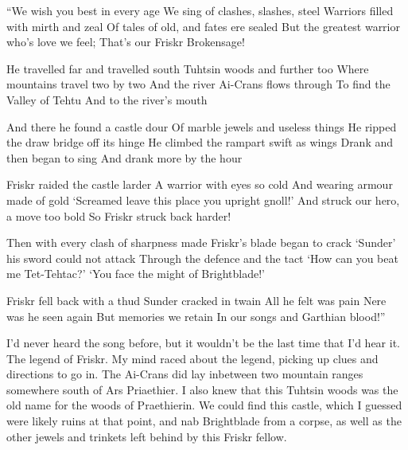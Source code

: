 \documentclass[12pt, a4paper]{book}
\begin{document}
\begin{poem}
\begin{stanza}
``We wish you best in every age\verseline
We sing of clashes, slashes, steel\verseline
Warriors filled with mirth and zeal\verseline
Of tales of old, and fates ere sealed\verseline
But the greatest warrior who's love we feel;\verseline
That's our Friskr Brokensage!
\end{stanza}
\begin{stanza}
He travelled far and travelled south\verseline
Tuhtsin woods and further too\verseline
Where mountains travel two by two\verseline
And the river Ai-Crans flows through\verseline
To find the Valley of Tehtu\verseline
And to the river's mouth
\end{stanza}
\begin{stanza}
And there he found a castle dour\verseline
Of marble jewels and useless things\verseline
He ripped the draw bridge off its hinge\verseline
He climbed the rampart swift as wings\verseline
Drank and then began to sing\verseline
And drank more by the hour
\end{stanza}
\begin{stanza}
Friskr raided the castle larder\verseline
A warrior with eyes so cold\verseline
And wearing armour made of gold\verseline
`Screamed leave this place you upright gnoll!'\verseline
And struck our hero, a move too bold\verseline
So Friskr struck back harder!
\end{stanza}
\begin{stanza}
Then with every clash of sharpness made\verseline
Friskr's blade began to crack\verseline
`Sunder' his sword could not attack\verseline
Through the defence and the tact\verseline
`How can you beat me Tet-Tehtac?'\verseline
`You face the might of Brightblade!'
\end{stanza}
\begin{stanza}
Friskr fell back with a thud\verseline
Sunder cracked in twain\verseline
All he felt was pain\verseline
Nere was he seen again\verseline
But memories we retain\verseline
In our songs and Garthian blood!''
\end{stanza}
\end{poem}

I'd never heard the song before, but it wouldn't be the last time that I'd hear it. The legend of Friskr. My mind raced about the legend, picking up clues and directions to go in. The Ai-Crans did lay inbetween two mountain ranges somewhere south of Ars Priaethier. I also knew that this Tuhtsin woods was the old name for the woods of Praethierin. We could find this castle, which I guessed were likely ruins at that point, and nab Brightblade from a corpse, as well as the other jewels and trinkets left behind by this Friskr fellow.
\end{document}
